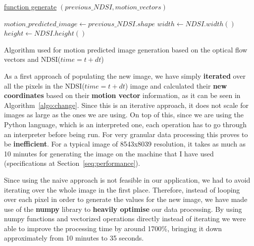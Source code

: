 \documentclass[12pt, a4paper]{report}
\begin{document}
	
	\begin{algorithm}
			
			\underline{function generate} $(previous\_NDSI, motion\_vectors)$\;
			
			$motion\_predicted\_image \gets previous\_NDSI.shape$\;
			$width \gets NDSI.width()$\;
			$height \gets NDSI.height()$\;
			
			\;

			\caption{Algorithm used for motion predicted image generation based on the optical flow vectors and NDSI(\(time=t+dt\))}
			\label{algo:change}
	\end{algorithm}
	
	\par As a first approach of populating the new image, we have simply \textbf{iterated} over all the pixels in the NDSI(\(time=t+dt\)) image and calculated their \textbf{new coordinates} based on their \textbf{motion vector} information, as it can be seen in Algorithm~\ref{algo:change}. Since this is an iterative approach, it does not scale for images as large as the ones we are using. On top of this, since we are using the Python language, which is an interpreted one, each operation has to go through an interpreter before being run. For very granular data processing this proves to be \textbf{inefficient}. For a typical image of 8543x8039 resolution, it takes as much as 10 minutes for generating the image on the machine that I have used (specifications at Section~\ref{seq:performance}).
	
	\par Since using the naive approach is not feasible in our application, we had to avoid iterating over the whole image in the first place. Therefore, instead of looping over each pixel in order to generate the values for the new image, we have made use of the \textbf{numpy} library to \textbf{heavily optimise} our data processing. By using numpy functions and vectorized operations directly instead of iterating we were able to improve the processing time by around 1700\%, bringing it down approximately from 10 minutes to 35 seconds.
	
\end{document}
